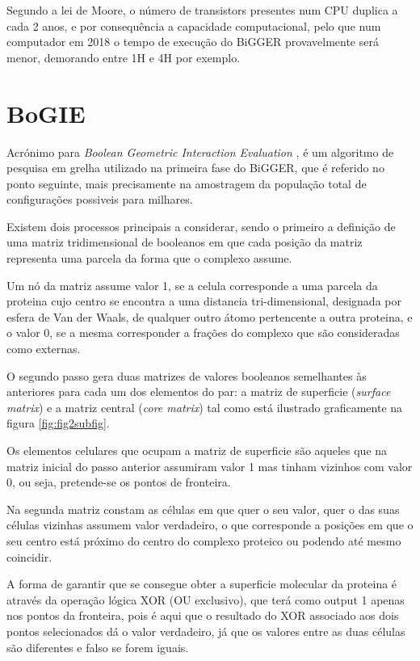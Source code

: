 Segundo a lei de Moore, o número de transistors presentes num CPU duplica a cada 2 anos, e por consequência a capacidade computacional, pelo que num computador em 2018 o tempo de execução do BiGGER provavelmente será menor, demorando entre 1H e 4H por exemplo.



\section{BoGIE}
\label{bogieAlg}
Acrónimo para \textit{Boolean Geometric Interaction Evaluation}\cite{teseProf} \cite{biggerPaper}, é um algoritmo de pesquisa em grelha utilizado na primeira fase do BiGGER, que é referido no ponto seguinte, mais precisamente na amostragem da população total de configurações possiveis para milhares.

 Existem dois processos principais a considerar, sendo o primeiro a definição de uma matriz tridimensional de booleanos em que cada posição da matriz representa uma parcela da forma que o complexo assume.
 
 Um nó da matriz assume valor 1, se a celula corresponde a uma parcela da proteina cujo centro se encontra a uma distancia tri-dimensional, designada por esfera de Van der Waals, de qualquer outro átomo pertencente a outra proteina, e o valor 0, se a mesma corresponder a frações do complexo que são consideradas como externas.

O segundo passo gera duas matrizes de valores booleanos semelhantes às anteriores para cada um dos elementos do par: a matriz de superficie (\textit{surface matrix}) e a matriz central (\textit{core matrix}) tal como está ilustrado graficamente na figura \ref{fig:fig2subfig}.

Os elementos celulares que ocupam a matriz de superficie são aqueles que na matriz inicial do passo anterior assumiram valor 1 mas tinham vizinhos com valor 0, ou seja, pretende-se os pontos de fronteira. 
 
 Na segunda matriz constam as células em que quer o seu valor, quer o das suas células vizinhas assumem valor verdadeiro, o que corresponde a posições em que o seu centro está próximo do centro do complexo proteico ou podendo até mesmo coincidir. 
 
 A forma de garantir que se consegue obter a superficie molecular da proteina é através da operação lógica XOR (OU exclusivo), que terá como output 1 apenas nos pontos da fronteira, pois é aqui que o resultado do XOR associado aos dois pontos selecionados dá o valor verdadeiro, já que os valores entre as duas células são diferentes e falso se forem iguais.
 
